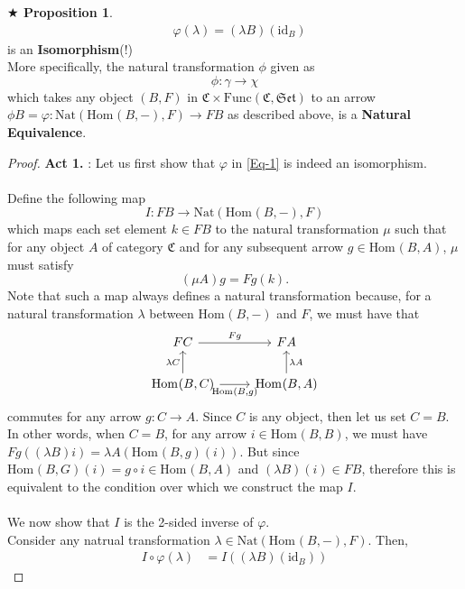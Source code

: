 \documentclass{article}
\theoremstyle{definition}
\theoremstyle{remark}
\theoremstyle{definition}
\theoremstyle{definition}
\newtheorem{proposition}{$\bigstar$ Proposition}
\theoremstyle{definition}
\newcommand{\cat}[1]{\mathfrak{#1}}
\newcommand{\Id}[1]{\text{id}_{#1}}
\newcommand{\homset}[3]{\text{Hom}_{#1}(#2,#3)}
\newcommand{\Func}[2]{\text{Func}\left (#1,#2\right )}
\newcommand{\Nat}[2]{\text{Nat}\left (#1,#2\right )}
\begin{document}
\begin{proposition}
\begin{equation}
\begin{split}
 		 & \varphi(\lambda) = (\lambda B) (\Id{B})
 	\end{split}
 \end{equation}
is an \textbf{Isomorphism}(!)\\
More specifically, the natural transformation $ \phi $ given as
\begin{equation}
	\phi : \gamma \longrightarrow \chi
\end{equation}
which takes any object $ (B,F) $ in $ \cat{C}\times \Func{\cat{C}}{\cat{Set}} $ to an arrow $ \phi B = \varphi : \Nat{\homset{}{B}{-}}{F} \to FB$ as described above, is a \textbf{Natural Equivalence}.
 \end{proposition}
\newpage
\begin{proof}
	\textbf{Act 1.} : Let us first show that $ \varphi $ in \eqref{Eq-1} is indeed an isomorphism. \\\\
	Define the following map 
	\[I : FB \longrightarrow \Nat{\homset{}{B}{-}}{F}\]
	which maps each set element $ k\in FB $ to the natural transformation $ \mu $ such that for any object $ A $ of category $ \cat{C} $ and for any subsequent arrow $ g \in \homset{}{B}{A} $, $ \mu $ must satisfy
	\[(\mu A)g = Fg(k).\]
	Note that such a map always defines a natural transformation because, for a natural transformation $ \lambda $ between $ \homset{}{B}{-} $ and $ F $, we must have that
\[\begin{tikzcd}
	FC & FA \\
	{\homset{}{B}{C}} & {\homset{}{B}{A}}
	\arrow["{\lambda C}", from=2-1, to=1-1]
	\arrow["{\lambda A}"', from=2-2, to=1-2]
	\arrow["Fg", from=1-1, to=1-2]
	\arrow["{\homset{}{B}{g}}"', from=2-1, to=2-2]
\end{tikzcd}\]
commutes for any arrow $ g : C\to A $. Since $ C $ is any object, then let us set $ C = B $. In other words, when $ C = B $, for any arrow $ i\in \homset{}{B}{B} $, we must have $ Fg((\lambda B) i) = \lambda A (\homset{}{B}{g}(i)) $. But since $ \homset{}{B}{G}(i) = g\circ i \in  \homset{}{B}{A} $ and $ (\lambda B)(i) \in FB $, therefore this is equivalent to the condition over which we construct the map $ I $. \\\\
We now show that $ I $ is the 2-sided inverse of $ \varphi $. \\
Consider any natrual transformation $ \lambda \in \Nat{\homset{}{B}{-}}{F} $. Then,
\begin{equation*}
	\begin{split}
		I\circ \varphi(\lambda) &= I((\lambda B)(\Id{B}))

\end{split}
\end{equation*}
\end{proof}
\end{document}
